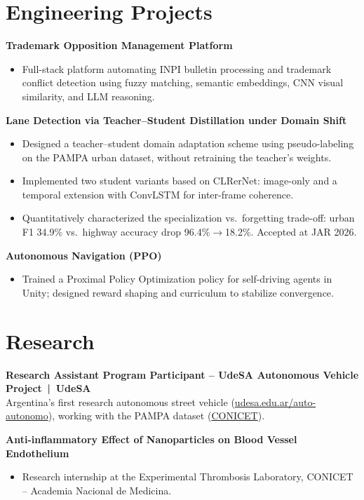 \documentclass[a4paper,10.5pt]{article}
\begin{document}
\section*{Engineering Projects}

\textbf{Trademark Opposition Management Platform}
\begin{itemize}
    \item Full-stack platform automating INPI bulletin processing and trademark conflict detection using fuzzy matching, semantic embeddings, CNN visual similarity, and LLM reasoning.
\end{itemize}

\textbf{Lane Detection via Teacher--Student Distillation under Domain Shift}
\begin{itemize}
    \item Designed a teacher--student domain adaptation scheme using pseudo-labeling on the PAMPA urban dataset, without retraining the teacher's weights.
    \item Implemented two student variants based on CLRerNet: image-only and a temporal extension with ConvLSTM for inter-frame coherence.
    \item Quantitatively characterized the specialization vs.\ forgetting trade-off: urban F1 34.9\% vs.\ highway accuracy drop 96.4\%$\to$18.2\%. Accepted at JAR 2026.
\end{itemize}

\textbf{Autonomous Navigation (PPO)}
\begin{itemize}
    \item Trained a Proximal Policy Optimization policy for self-driving agents in Unity; designed reward shaping and curriculum to stabilize convergence.
\end{itemize}

\section*{Research}

\textbf{Research Assistant Program Participant -- UdeSA Autonomous Vehicle Project \,|\, UdeSA}\\
Argentina's first research autonomous street vehicle (\href{https://udesa.edu.ar/auto-autonomo}{udesa.edu.ar/auto-autonomo}), working with the PAMPA dataset (\href{https://ri.conicet.gov.ar/handle/11336/242774}{CONICET}).

\smallskip

\textbf{Anti-inflammatory Effect of Nanoparticles on Blood Vessel Endothelium}
\begin{itemize}
    \item Research internship at the Experimental Thrombosis Laboratory, CONICET -- Academia Nacional de Medicina.
\end{itemize}
\end{document}
